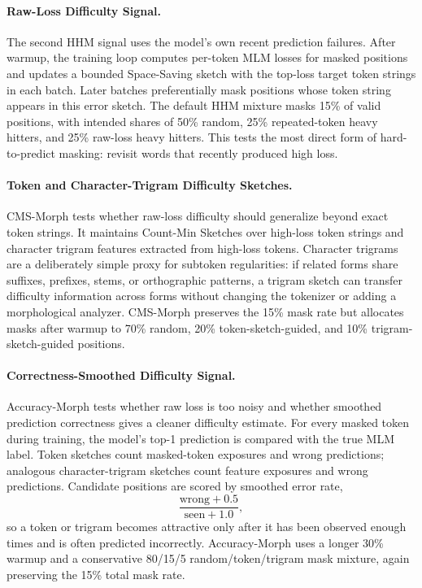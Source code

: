 \paragraph{Raw-Loss Difficulty Signal.}
The second HHM signal uses the model's own recent prediction failures. After warmup, the training loop computes per-token MLM losses for masked positions and updates a bounded Space-Saving sketch with the top-loss target token strings in each batch. Later batches preferentially mask positions whose token string appears in this error sketch. The default HHM mixture masks 15\% of valid positions, with intended shares of 50\% random, 25\% repeated-token heavy hitters, and 25\% raw-loss heavy hitters. This tests the most direct form of hard-to-predict masking: revisit words that recently produced high loss.

\paragraph{Token and Character-Trigram Difficulty Sketches.}
CMS-Morph tests whether raw-loss difficulty should generalize beyond exact token strings. It maintains Count-Min Sketches over high-loss token strings and character trigram features extracted from high-loss tokens. Character trigrams are a deliberately simple proxy for subtoken regularities: if related forms share suffixes, prefixes, stems, or orthographic patterns, a trigram sketch can transfer difficulty information across forms without changing the tokenizer or adding a morphological analyzer. CMS-Morph preserves the 15\% mask rate but allocates masks after warmup to 70\% random, 20\% token-sketch-guided, and 10\% trigram-sketch-guided positions.

\paragraph{Correctness-Smoothed Difficulty Signal.}
Accuracy-Morph tests whether raw loss is too noisy and whether smoothed prediction correctness gives a cleaner difficulty estimate. For every masked token during training, the model's top-1 prediction is compared with the true MLM label. Token sketches count masked-token exposures and wrong predictions; analogous character-trigram sketches count feature exposures and wrong predictions. Candidate positions are scored by smoothed error rate,
\[
  \frac{\mathrm{wrong} + 0.5}{\mathrm{seen} + 1.0},
\]
so a token or trigram becomes attractive only after it has been observed enough times and is often predicted incorrectly. Accuracy-Morph uses a longer 30\% warmup and a conservative 80/15/5 random/token/trigram mask mixture, again preserving the 15\% total mask rate.

